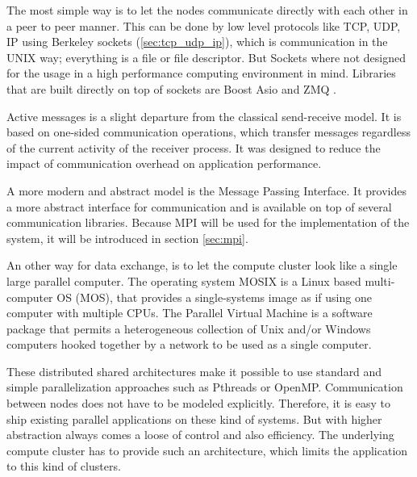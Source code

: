The most simple way is to let the nodes communicate directly with each
other in a peer to peer manner.  This can be done by low level
protocols like TCP, UDP, IP using Berkeley sockets
(\ref{sec:tcp_udp_ip}), which is communication in the UNIX way;
everything is a file or file descriptor. But Sockets where not
designed for the usage in a high performance computing environment in
mind. Libraries that are built directly on top of sockets are Boost
Asio \cite{ref:boost_asio} and ZMQ \cite{ref:ZMQ}.

Active messages \cite{ref:am} is a slight departure from the classical
send-receive model. It is based on one-sided communication operations,
which transfer messages regardless of the current activity of the
receiver process. It was designed to reduce the impact of
communication overhead on application performance.

A more modern and abstract model is the Message Passing Interface. It
provides a more abstract interface for communication and is available
on top of several communication libraries. Because MPI will be used
for the implementation of the system, it will be introduced
in section \ref{sec:mpi}.

An other way for data exchange, is to let the compute cluster look
like a single large parallel computer. The operating system MOSIX
\cite{ref:mosix} is a Linux based multi-computer OS (MOS), that
provides a single-systems image\cite{ref:single_system_image} as if
using one computer with multiple CPUs. The Parallel Virtual
Machine\cite{ref:pvm} is a software package that permits a
heterogeneous collection of Unix and/or Windows computers hooked
together by a network to be used as a single computer.

These distributed shared architectures make it possible to use
standard and simple parallelization approaches such as Pthreads or OpenMP.
Communication between nodes does not have to be modeled explicitly.
Therefore, it is easy to ship existing parallel applications on these kind
of systems. But with higher abstraction always comes a
loose of control and also efficiency. The underlying
compute cluster has to provide such an architecture, which limits the
application to this kind of clusters.

